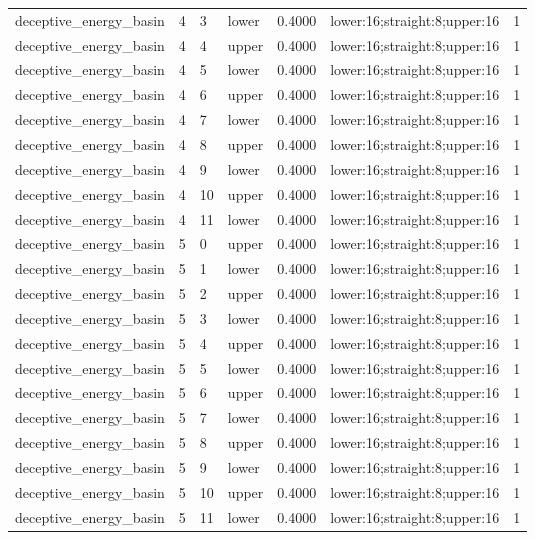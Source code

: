 \documentclass{article}
\begin{document}
\begin{table}[tbp]
{\begin{tabular}{lllllll}
deceptive\_energy\_basin & 4 & 3 & lower & 0.4000 & lower:16;straight:8;upper:16 & 1 \\
deceptive\_energy\_basin & 4 & 4 & upper & 0.4000 & lower:16;straight:8;upper:16 & 1 \\
deceptive\_energy\_basin & 4 & 5 & lower & 0.4000 & lower:16;straight:8;upper:16 & 1 \\
deceptive\_energy\_basin & 4 & 6 & upper & 0.4000 & lower:16;straight:8;upper:16 & 1 \\
deceptive\_energy\_basin & 4 & 7 & lower & 0.4000 & lower:16;straight:8;upper:16 & 1 \\
deceptive\_energy\_basin & 4 & 8 & upper & 0.4000 & lower:16;straight:8;upper:16 & 1 \\
deceptive\_energy\_basin & 4 & 9 & lower & 0.4000 & lower:16;straight:8;upper:16 & 1 \\
deceptive\_energy\_basin & 4 & 10 & upper & 0.4000 & lower:16;straight:8;upper:16 & 1 \\
deceptive\_energy\_basin & 4 & 11 & lower & 0.4000 & lower:16;straight:8;upper:16 & 1 \\
deceptive\_energy\_basin & 5 & 0 & upper & 0.4000 & lower:16;straight:8;upper:16 & 1 \\
deceptive\_energy\_basin & 5 & 1 & lower & 0.4000 & lower:16;straight:8;upper:16 & 1 \\
deceptive\_energy\_basin & 5 & 2 & upper & 0.4000 & lower:16;straight:8;upper:16 & 1 \\
deceptive\_energy\_basin & 5 & 3 & lower & 0.4000 & lower:16;straight:8;upper:16 & 1 \\
deceptive\_energy\_basin & 5 & 4 & upper & 0.4000 & lower:16;straight:8;upper:16 & 1 \\
deceptive\_energy\_basin & 5 & 5 & lower & 0.4000 & lower:16;straight:8;upper:16 & 1 \\
deceptive\_energy\_basin & 5 & 6 & upper & 0.4000 & lower:16;straight:8;upper:16 & 1 \\
deceptive\_energy\_basin & 5 & 7 & lower & 0.4000 & lower:16;straight:8;upper:16 & 1 \\
deceptive\_energy\_basin & 5 & 8 & upper & 0.4000 & lower:16;straight:8;upper:16 & 1 \\
deceptive\_energy\_basin & 5 & 9 & lower & 0.4000 & lower:16;straight:8;upper:16 & 1 \\
deceptive\_energy\_basin & 5 & 10 & upper & 0.4000 & lower:16;straight:8;upper:16 & 1 \\
deceptive\_energy\_basin & 5 & 11 & lower & 0.4000 & lower:16;straight:8;upper:16 & 1 \\
\bottomrule
\end{tabular}
}
\end{table}
\end{document}
